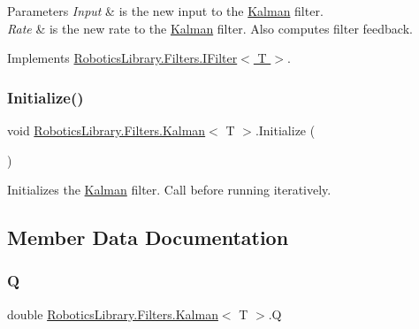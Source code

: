 \begin{DoxyParams}{Parameters}
{\em Input} & is the new input to the \hyperlink{class_robotics_library_1_1_filters_1_1_kalman}{Kalman} filter.\\
\hline
{\em Rate} & is the new rate to the \hyperlink{class_robotics_library_1_1_filters_1_1_kalman}{Kalman} filter. Also computes filter feedback. \\
\hline
\end{DoxyParams}


Implements \hyperlink{interface_robotics_library_1_1_filters_1_1_i_filter_a24d363fb2957923a256448e04634d9ca}{Robotics\+Library.\+Filters.\+I\+Filter$<$ T $>$}.

\mbox{\label{class_robotics_library_1_1_filters_1_1_kalman_aec1fb77c692d3d444d1cbd60f2b2592c}} 
\subsubsection{\texorpdfstring{Initialize()}{Initialize()}}
{\footnotesize\ttfamily void \hyperlink{class_robotics_library_1_1_filters_1_1_kalman}{Robotics\+Library.\+Filters.\+Kalman}$<$ T $>$.Initialize (\begin{DoxyParamCaption}{ }\end{DoxyParamCaption})}



Initializes the \hyperlink{class_robotics_library_1_1_filters_1_1_kalman}{Kalman} filter. Call before running iteratively.



\subsection{Member Data Documentation}
\mbox{\label{class_robotics_library_1_1_filters_1_1_kalman_a99ad42967bc86d34d72dfac39fa83a56}} 
\subsubsection{\texorpdfstring{Q}{Q}}
{\footnotesize\ttfamily double \hyperlink{class_robotics_library_1_1_filters_1_1_kalman}{Robotics\+Library.\+Filters.\+Kalman}$<$ T $>$.Q}

